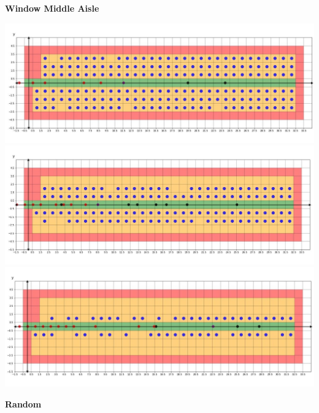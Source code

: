 \documentclass{article}
\theoremstyle{definition}
\theoremstyle{remark}
\numberwithin{equation}{section}
\begin{document}
	\large \textbf{Window Middle Aisle}
	\begin{center}
		\includegraphics[width=14cm]{wdmd1.jpg}\\
		\includegraphics[width=14cm]{wdmd2.jpg}\\
		\includegraphics[width=14cm]{wdmd3.jpg}\\
	\end{center}
	\large \textbf{Random}
\end{document}
